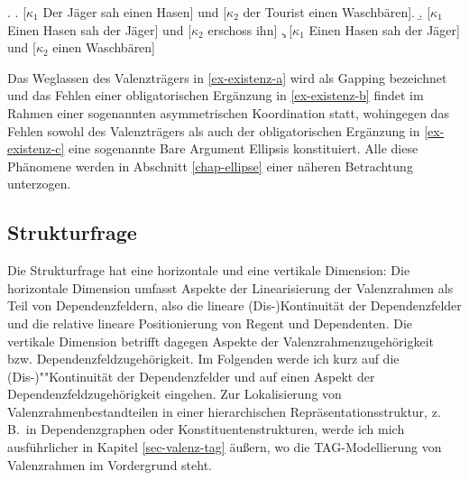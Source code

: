 \ex. \label{ex-existenz}
\a. \label{ex-existenz-a} [$\kappa_1$ Der Jäger sah einen Hasen] und [$\kappa_2$ der Tourist einen Waschbären].
\b. \label{ex-existenz-b} [$\kappa_1$ Einen Hasen sah der Jäger] und [$\kappa_2$ erschoss ihn]
\c. \label{ex-existenz-c} [$\kappa_1$ Einen Hasen sah der Jäger] und [$\kappa_2$ einen Waschbären]

Das Weglassen des Valenzträgers in \ref{ex-existenz-a} wird als Gapping bezeichnet und das Fehlen einer obligatorischen Ergänzung in \ref{ex-existenz-b} findet im Rahmen einer sogenannten asymmetrischen Koordination statt, wohingegen das Fehlen sowohl des Valenzträgers als auch der obligatorischen Ergänzung in \ref{ex-existenz-c} eine sogenannte Bare Argument Ellipsis konstituiert. Alle diese Phänomene werden in Abschnitt \ref{chap-ellipse} einer näheren Betrachtung unterzogen.



\subsection{Strukturfrage} \label{sec-strukturfrage}

Die Strukturfrage hat eine horizontale und eine vertikale Dimension: Die horizontale Dimension umfasst Aspekte der Linearisierung der Valenzrahmen als Teil von Dependenzfeldern, also die lineare (Dis-)Kontinuität der Dependenzfelder und die relative lineare Positionierung von Regent und Dependenten. Die vertikale Dimension betrifft dagegen Aspekte der Valenzrahmenzugehörigkeit bzw. Dependenzfeldzugehörigkeit. Im Folgenden werde ich kurz auf die (Dis-)""Kontinuität der Dependenzfelder und auf einen Aspekt der Dependenzfeldzugehörigkeit eingehen. Zur Lokalisierung von Valenzrahmenbestandteilen in einer hierarchischen Repräsentationsstruktur, z.\,B.\ in Dependenzgraphen oder Konstituentenstrukturen, werde ich mich ausführlicher in Kapitel \ref{sec-valenz-tag} äu\ss ern, wo die TAG-Modellierung von Valenzrahmen im Vordergrund steht.

